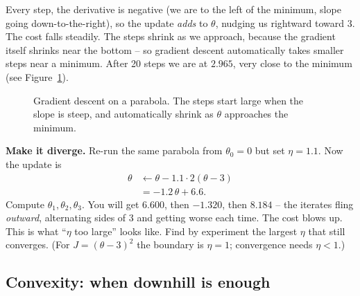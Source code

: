 Every step, the derivative is negative (we are to the left of
the minimum, slope going down-to-the-right), so the update \emph{adds} to
$\theta$, nudging us rightward toward $3$. The cost falls steadily. The steps
shrink as we approach, because the gradient itself shrinks near the bottom --
so gradient descent automatically takes smaller steps near a minimum. After 20
steps we are at $2.965$, very close to the minimum (see Figure~\ref{ch36:fig-gd-1d}).

\begin{figure}[htbp]
\centering
{}
\caption{Gradient descent on a parabola. The steps start large when the slope is steep, and automatically shrink as $\theta$ approaches the minimum.}
\label{ch36:fig-gd-1d}
\end{figure}

\begin{labbox}
\textbf{Make it diverge.} Re-run the same parabola from $\theta_0 = 0$ but set
$\eta = 1.1$. Now the update is
\begin{align*}
  \theta &\leftarrow \theta - 1.1\cdot 2(\theta-3) \\
         &= -1.2\,\theta + 6.6.
\end{align*} Compute $\theta_1, \theta_2, \theta_3$. You will get
$6.600$, then $-1.320$, then $8.184$ -- the iterates fling \emph{outward},
alternating sides of $3$ and getting worse each time. The cost blows up. This is what
``$\eta$ too large'' looks like. Find by experiment the
largest $\eta$ that still converges. (For $J=(\theta-3)^2$ the boundary is
$\eta = 1$; convergence needs $\eta < 1$.)
\end{labbox}

\subsection{Convexity: when downhill is enough}

